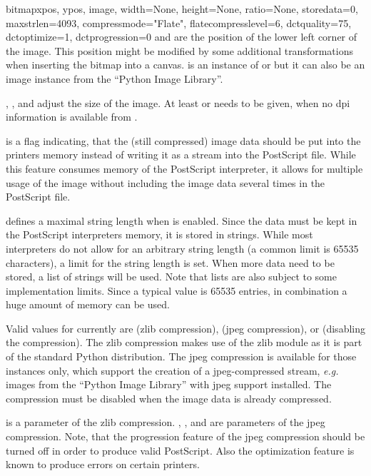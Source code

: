 \begin{classdesc}{bitmap}{xpos, ypos, image, width=None, height=None,
  ratio=None, storedata=0, maxstrlen=4093, compressmode="Flate",
  flatecompresslevel=6, dctquality=75, dctoptimize=1,
  dctprogression=0}
   and  are the position of the lower left corner
  of the image. This position might be modified by some additional
  transformations when inserting the bitmap into a canvas. 
  is an instance of  or  but it can also
  be an image instance from the ``Python Image Library''.

  , , and  adjust the size of the
  image. At least  or  needs to be given, when
  no dpi information is available from .

   is a flag indicating, that the (still compressed)
  image data should be put into the printers memory instead of writing
  it as a stream into the PostScript file. While this feature consumes
  memory of the PostScript interpreter, it allows for multiple usage
  of the image without including the image data several times in the
  PostScript file.

   defines a maximal string length when 
  is enabled. Since the data must be kept in the PostScript
  interpreters memory, it is stored in strings. While most
  interpreters do not allow for an arbitrary string length (a common
  limit is 65535 characters), a limit for the string length is set.
  When more data need to be stored, a list of strings will be used.
  Note that lists are also subject to some implementation limits. Since
  a typical value is 65535 entries, in combination a huge amount of
  memory can be used.

  Valid values for  currently are
   (zlib compression),
   (jpeg compression), or
   (disabling the compression). The zlib compression makes
  use of the zlib module as it is part of the standard Python
  distribution. The jpeg compression is available for those
   instances only, which support the creation of a
  jpeg-compressed stream, \emph{e.g.} images from the ``Python Image
  Library'' with jpeg support installed. The compression must be
  disabled when the image data is already compressed.

   is a parameter of the zlib compression.
  , , and  are
  parameters of the jpeg compression. Note, that the progression
  feature of the jpeg compression should be turned off in order to
  produce valid PostScript. Also the optimization feature is known to
  produce errors on certain printers.
\end{classdesc}

